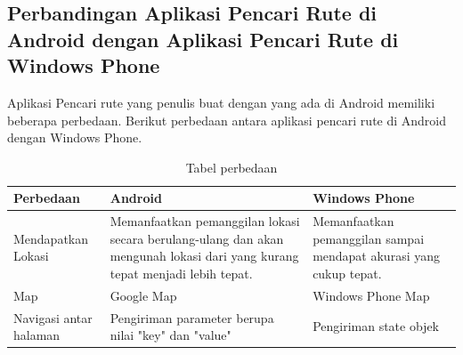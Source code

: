 \subsection{Perbandingan Aplikasi Pencari Rute di Android dengan Aplikasi Pencari Rute di Windows Phone}
\label{lab:Perbandingan}
\hspace{0.5cm} Aplikasi Pencari rute yang penulis buat dengan yang ada di Android memiliki beberapa perbedaan. Berikut perbedaan antara aplikasi pencari rute di Android dengan Windows Phone.

\begin{table}[h]
	\centering
		\begin{tabular}{|p{4cm}|p{4cm}|p{4cm}|}\hline
				Perbedaan & Android & Windows Phone \\ \hline
				Mendapatkan Lokasi & Memanfaatkan pemanggilan lokasi secara berulang-ulang dan akan mengunah lokasi dari yang kurang tepat menjadi lebih tepat. & Memanfaatkan pemanggilan sampai mendapat akurasi yang cukup tepat. \\ \hline
				Map  & Google Map & Windows Phone Map \\ \hline
				Navigasi antar halaman  & Pengiriman parameter berupa nilai "key" dan "value" & Pengiriman state objek \\ \hline
		\end{tabular}
	\caption{Tabel perbedaan}
	\label{tab:TabelPerbedaan}
\end{table}